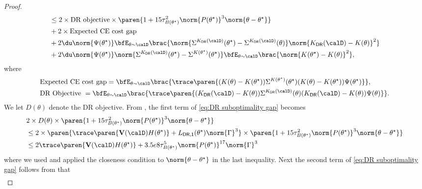\begin{proof}
\begin{align}
        &\leq 2 \times  \mbox{DR objective}\times \paren{1 + 15 \tau_{B(\theta^\star)}^2 \norm{P(\theta^\star)}^3 \norm{\theta - \theta^\star}} \nonumber\\
        &+ 2 \times \mbox{Expected CE cost gap} \nonumber\\
        & + 2 \du \norm{\Psi(\theta^\star)} \bfE_{\theta\sim\calD}\brac{\norm{\Sigma^{K_{\mathsf{DR}}(\calD)}(\theta^\star) - \Sigma^{K_{\mathsf{DR}}(\calD)}(\theta)} \norm{K_{\mathsf{DR}}(\calD) - K(\theta)}^2} \nonumber\\
        &+ 2 \du \norm{\Psi(\theta^\star)} \norm{\Sigma^{K_{\mathsf{DR}}(\calD)}(\theta^\star) - \Sigma^{K(\theta^\star)}(\theta^\star)}\bfE_{\theta\sim\calD}\brac{ \norm{K(\theta^\star) - K(\theta)}^2}, \label{eq:DR suboptimality gap}
    \end{align}
    where 
    \begin{align*}
        &\mbox{Expected CE cost gap}  = \bfE_{\theta\sim\calD} \brac{\trace\paren{(K(\theta) - K(\theta^\star)) \Sigma^{K(\theta^\star)}(\theta^\star)  (K(\theta) - K(\theta^\star)) \Psi(\theta^\star)}}, \\
         &\mbox{DR Objective }=  \bfE_{\theta\sim\calD} \brac{\trace\paren{(K_{\mathsf{DR}}(\calD) - K(\theta)) \Sigma^{K_{\mathsf{DR}}(\calD)}(\theta)  (K_{\mathsf{DR}}(\calD) - K(\theta)) \Psi(\theta)}}.
    \end{align*}
    We let $D(\theta)$ denote the DR objective.
    From , the first term of \eqref{eq:DR suboptimality gap} becomes
    \begin{align}
        &2\times D(\theta)\times \paren{1 + 15 \tau_{B(\theta^\star)}^2 \norm{P(\theta^\star)}^3 \norm{\theta - \theta^\star}}\nonumber\\
        &\leq 2 \times \paren{\trace\paren{\mathbf{V}(\calD) H(\theta^\star)} + L_{\mathsf{DR,1}}(\theta^\star)  \norm{\Gamma}^3} \times \paren{1 + 15 \tau_{B(\theta^\star)}^2 \norm{P(\theta^\star)}^3\norm{\theta - \theta^\star}} \nonumber\\
        &\leq 2\trace\paren{\mathbf{V}(\calD) H(\theta^\star)} + 3.5e8\tau_{B(\theta^\star)}^5\norm{P(\theta^\star)}^{17}\norm{\Gamma}^3 \label{eq: first term of DR suboptimality gap}
    \end{align}
    where we used  and applied the closeness condition to $\norm{\theta-\theta^\star}$ in the last inequality. 
    Next the second term of \eqref{eq:DR suboptimality gap} follows from  that
    \begin{align}

\end{align}
\end{proof}
